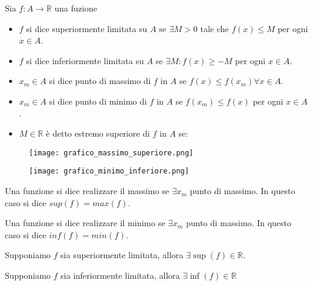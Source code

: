 \documentclass[../main.tex, class=article, 12pt]{subfiles}
\begin{document}
\begin{definition}
        Sia $ f : A \to \mathbb{R} $ una fuzione
        \begin{itemize}
                \item $ f $ si dice superiormente limitata su $ A $ se $ \exists M > 0 $ tale che $ f(x) \le M $ per ogni $ x \in A $.
                \item $ f $ si dice inferiormente limitata su $ A $ se $ \exists M : f(x) \ge -M  $ per ogni $ x \in A $.
                \item $ x_m \in A $ si dice punto di massimo di $ f $ in $ A $ se $ f(x) \le f(x_m) \forall x \in A $.
                \item $ x_m \in A $ si dice punto di minimo di $ f $ in $ A $ se $ f(x_m) \le f(x)  $ per ogni $ x \in A $.
                \item $ M \in \mathbb{R} $ è detto estremo superiore di $ f $ in $ A $ se:
        \end{itemize}

        \begin{figure}[H]
          	\texttt{[image: grafico\_massimo\_superiore.png]}
          	\caption{}
                \label{fig:grafico_massimo_superiore.png}
        \end{figure}
        \begin{figure}[H]
          	\texttt{[image: grafico\_minimo\_inferiore.png]}
          	\caption{}
                \label{fig:grafico_minimo_inferiore.png}
        \end{figure}
\end{definition}

\newpage
Una funzione si dice realizzare il massimo se $ \exists x_m $ punto di massimo. In questo caso si dice $ sup(f) = max(f) $. \par
Una funzione si dice realizzare il minimo se $ \exists x_m $ punto di massimo. In questo caso si dice $ inf(f) = min(f) $.

\begin{tcolorbox}
\begin{theorem}
        Supponiamo $ f $ sia superiormente limitata, allora $ \exists \sup(f)  \in \mathbb{R}$.
\end{theorem}
\begin{theorem}
        Supponiamo $ f $ sia inferiormente limitata, allora $ \exists \inf(f)  \in \mathbb{R}$
\end{theorem}
\end{tcolorbox}
\end{document}
